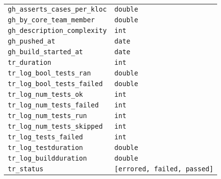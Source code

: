 \begin{table}
\begin{tabular}{ l l }
		\texttt{gh\_asserts\_cases\_per\_kloc} &           \texttt{double} \\ 
		\texttt{gh\_by\_core\_team\_member} &              \texttt{double} \\ 
		\texttt{gh\_description\_complexity} &           \texttt{int} \\ 
		\texttt{gh\_pushed\_at} &                        \texttt{date} \\ 
		\texttt{gh\_build\_started\_at} &                 \texttt{date} \\ 
		\texttt{tr\_duration} &                         \texttt{int} \\ 
		\texttt{tr\_log\_bool\_tests\_ran} &               \texttt{double} \\ 
		\texttt{tr\_log\_bool\_tests\_failed} &            \texttt{double} \\ 
		\texttt{tr\_log\_num\_tests\_ok} &                 \texttt{int} \\ 
		\texttt{tr\_log\_num\_tests\_failed} &             \texttt{int} \\ 
		\texttt{tr\_log\_num\_tests\_run} &                \texttt{int} \\ 
		\texttt{tr\_log\_num\_tests\_skipped} &            \texttt{int} \\ 
		\texttt{tr\_log\_tests\_failed} &                 \texttt{int} \\ 
		\texttt{tr\_log\_testduration} &                 \texttt{double} \\ 
		\texttt{tr\_log\_buildduration} &                \texttt{double} \\ 
		\texttt{tr\_status} &                           \texttt{[errored, failed, passed]}
	\end{tabular}
\end{table}

